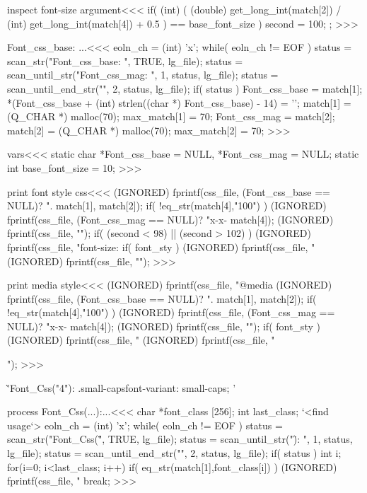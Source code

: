 {\<inspect font-size argument\><<<
if(  (int) (  (double) get_long_int(match[2])
            / (int) get_long_int(match[4])
            + 0.5
           )
      == base_font_size
){
   second = 100;
};
>>>








\<Font_css_base: ...\><<<
eoln_ch = (int) 'x';
while( eoln_ch != EOF ) {              
   status = scan_str("Font_css_base: ", TRUE, lg_file);
   status = scan_until_str("Font_css_mag: ", 1, status, lg_file);
   status = scan_until_end_str("", 2, status, lg_file);
   if( status ){
      Font_css_base = match[1];  
      *(Font_css_base + (int) strlen((char *) Font_css_base) - 14) = '\0';
      match[1] = (Q_CHAR *) malloc(70);  max_match[1] = 70;
      Font_css_mag = match[2];
      match[2] = (Q_CHAR *) malloc(70);  max_match[2] = 70;
} } 
>>>




\<vars\><<<
static char *Font_css_base = NULL,
            *Font_css_mag = NULL;
static int base_font_size = 10;
>>>



\<print font style css\><<<
(IGNORED) fprintf(css_file, 
   (Font_css_base == NULL)? ".%
   match[1], match[2]);
if( !eq_str(match[4],"100") ){ 
   (IGNORED) fprintf(css_file,
   (Font_css_mag == NULL)? "x-x-%
   match[4]);
}
(IGNORED) fprintf(css_file, "{");
if( (second < 98) || (second > 102) ){
   (IGNORED) fprintf(css_file, "font-size:%
}
if( font_sty  ) {
   (IGNORED) fprintf(css_file, "%
}
(IGNORED) fprintf(css_file, "}\n");
>>>


\<print media style\><<<
(IGNORED) fprintf(css_file, "@media %
(IGNORED) fprintf(css_file, 
   (Font_css_base == NULL)? ".%
   match[1], match[2]);
if( !eq_str(match[4],"100") ){ 
   (IGNORED) fprintf(css_file,
   (Font_css_mag == NULL)? "x-x-%
   match[4]);
}
(IGNORED) fprintf(css_file, "{");
if( font_sty  ) {
   (IGNORED) fprintf(css_file, "%
}
(IGNORED) fprintf(css_file, "}}\n");
>>>



\`'Font_Css("4"): .small-caps{font-variant: small-caps; }'

\<process Font_Css(...):...\><<<
{            char  *font_class [256];
             int last_class;
   `<find usage`>
   eoln_ch = (int) 'x';
   while( eoln_ch != EOF ) {              
      status = scan_str("Font_Css(\"", TRUE, lg_file);
      status = scan_until_str("\"): ", 1, status, lg_file);
      status = scan_until_end_str("", 2, status, lg_file);
      if( status ){            int i;
        for(i=0; i<last_class; i++){
          if( eq_str(match[1],font_class[i]) ){
             (IGNORED) fprintf(css_file, "%
             break;
}  }  } } }
>>>



